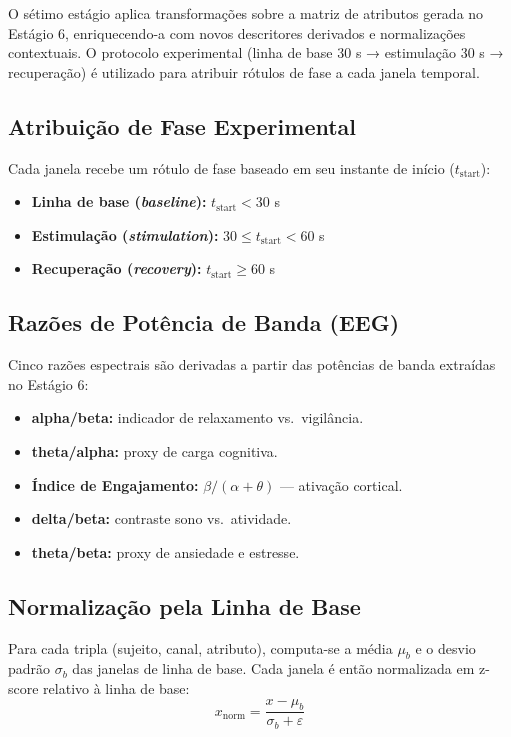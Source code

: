 O sétimo estágio aplica transformações sobre a matriz de atributos gerada no Estágio 6, enriquecendo-a com novos descritores derivados e normalizações contextuais. O protocolo experimental (linha de base 30 s → estimulação 30 s → recuperação) é utilizado para atribuir rótulos de fase a cada janela temporal.

\subsection{Atribuição de Fase Experimental}

Cada janela recebe um rótulo de fase baseado em seu instante de início ($t_{\text{start}}$):
\begin{itemize}
    \item \textbf{Linha de base (\textit{baseline}):} $t_{\text{start}} < 30$ s
    \item \textbf{Estimulação (\textit{stimulation}):} $30 \leq t_{\text{start}} < 60$ s
    \item \textbf{Recuperação (\textit{recovery}):} $t_{\text{start}} \geq 60$ s
\end{itemize}

\subsection{Razões de Potência de Banda (EEG)}

Cinco razões espectrais são derivadas a partir das potências de banda extraídas no Estágio 6:
\begin{itemize}
    \item \textbf{alpha/beta:} indicador de relaxamento vs.\ vigilância.
    \item \textbf{theta/alpha:} proxy de carga cognitiva.
    \item \textbf{Índice de Engajamento:} $\beta / (\alpha + \theta)$ — ativação cortical.
    \item \textbf{delta/beta:} contraste sono vs.\ atividade.
    \item \textbf{theta/beta:} proxy de ansiedade e estresse.
\end{itemize}

\subsection{Normalização pela Linha de Base}

Para cada tripla (sujeito, canal, atributo), computa-se a média $\mu_b$ e o desvio padrão $\sigma_b$ das janelas de linha de base. Cada janela é então normalizada em z-score relativo à linha de base:
\begin{equation}
    x_{\text{norm}} = \frac{x - \mu_b}{\sigma_b + \varepsilon}
\end{equation}

